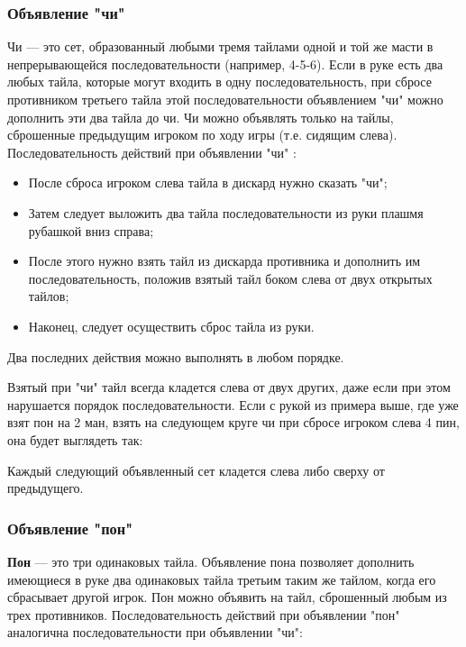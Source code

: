 \subsubsection{Объявление "чи"}

Чи --- это сет, образованный любыми тремя тайлами одной и той же масти в непрерывающейся последовательности (например, 4-5-6). Если в руке есть два любых тайла, которые могут входить в одну последовательность, при сбросе противником третьего тайла этой последовательности объявлением "чи" можно дополнить эти два тайла до чи. Чи можно объявлять только на тайлы, сброшенные предыдущим игроком по ходу игры (т.е. сидящим слева). Последовательность действий при объявлении "чи" :

\begin{itemize}
	\item После сброса игроком слева тайла в дискард нужно сказать "чи";
	\item Затем следует выложить два тайла последовательности из руки плашмя рубашкой вниз справа;
	\item После этого нужно взять тайл из дискарда противника и дополнить им последовательность, положив взятый тайл боком слева от двух открытых тайлов;
	\item Наконец, следует осуществить сброс тайла из руки.
\end{itemize}
Два последних действия можно выполнять в любом порядке.

Взятый при "чи" тайл всегда кладется слева от двух других, даже если при этом нарушается порядок последовательности. Если с рукой из примера выше, где уже взят пон на 2 ман, взять на следующем круге чи при сбросе игроком слева 4 пин, она будет выглядеть так:

 \hfill {}

Каждый следующий объявленный сет кладется слева либо сверху от предыдущего.

\subsubsection{Объявление "пон" }

\textbf{Пон} --- это три одинаковых тайла. Объявление пона позволяет дополнить имеющиеся в руке два одинаковых тайла третьим таким же тайлом, когда его сбрасывает другой игрок. Пон можно объявить на тайл, сброшенный любым из трех противников. Последовательность действий при объявлении "пон" аналогична последовательности при объявлении "чи":

